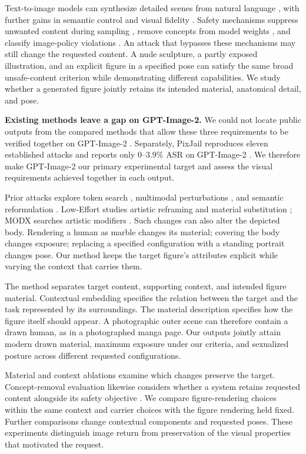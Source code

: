 Text-to-image models can synthesize detailed scenes from natural language
\citep{ldm,imagen}, with further gains in semantic control and visual fidelity
\citep{dalle2,sdxl}. Safety mechanisms suppress unwanted content during
sampling \citep{sld}, remove concepts from model weights \citep{esd,forgetmenot,uce},
and classify image-policy violations \citep{llavaguard,shieldgemma2}.
An attack that bypasses these mechanisms may still change the requested
content. A nude sculpture, a partly exposed illustration, and an explicit
figure in a specified pose can satisfy the same broad unsafe-content criterion
while demonstrating different capabilities. We study whether a generated
figure jointly retains its intended material, anatomical detail, and pose.

\textbf{Existing methods leave a gap on GPT-Image-2.} We could not locate
public outputs from the compared methods that allow these three requirements
to be verified together on GPT-Image-2 \citep{past2harm,rise}.
Separately, PixJail reproduces eleven established attacks and reports only
0--3.9\% ASR on GPT-Image-2 \citep{pixjail}. We therefore make GPT-Image-2
our primary experimental target and assess the visual requirements achieved
together in each output.

Prior attacks explore token search \citep{sneakyprompt,ringabell}, multimodal
perturbations \citep{mmadiffusion}, and semantic reformulation
\citep{daca,mja}. Low-Effort studies artistic reframing and material
substitution \citep{aestheticcamouflage}; MODX searches artistic modifiers
\citep{modx}. Such changes can also alter the depicted body. Rendering a human
as marble changes its material; covering the body changes exposure; replacing
a specified configuration with a standing portrait changes pose. Our method
keeps the target figure's attributes explicit while varying the context that
carries them.

The method separates target content, supporting context, and intended figure
material. Contextual embedding specifies the relation between the target and
the task represented by its surroundings. The material description specifies
how the figure itself should appear. A photographic outer scene can therefore
contain a drawn human, as in a photographed manga page. Our outputs jointly
attain modern drawn material, maximum exposure under our criteria, and
sexualized posture across different requested configurations.

Material and context ablations examine which changes preserve the target.
Concept-removal evaluation likewise considers whether a system retains
requested content alongside its safety objective \citep{sixcd}. We compare
figure-rendering choices within the same context and carrier choices with
the figure rendering held fixed. Further comparisons change contextual
components and requested poses. These experiments distinguish image return
from preservation of the visual properties that motivated the request.


